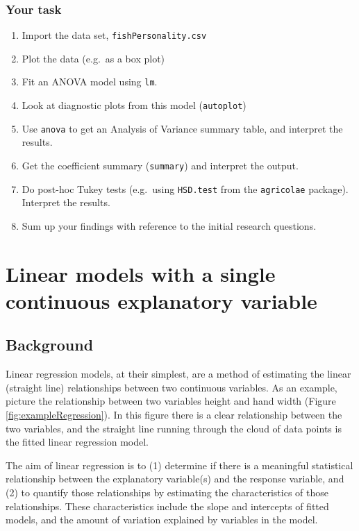 \documentclass[
  a4paperpaper,
]{book}
\begin{document}
\hypertarget{your-task}{%
\subsection{Your task}\label{your-task}}

\begin{enumerate}
\def\labelenumi{\arabic{enumi})}
\item
  Import the data set, \texttt{fishPersonality.csv}
\item
  Plot the data (e.g.~as a box plot)
\item
  Fit an ANOVA model using \texttt{lm}.
\item
  Look at diagnostic plots from this model (\texttt{autoplot})
\item
  Use \texttt{anova} to get an Analysis of Variance summary table, and interpret the results.
\item
  Get the coefficient summary (\texttt{summary}) and interpret the output.
\item
  Do post-hoc Tukey tests (e.g.~using \texttt{HSD.test} from the \texttt{agricolae} package). Interpret the results.
\item
  Sum up your findings with reference to the initial research questions.
\end{enumerate}

\hypertarget{linear-models-with-a-single-continuous-explanatory-variable}{%
\chapter{Linear models with a single continuous explanatory variable}\label{linear-models-with-a-single-continuous-explanatory-variable}}

\hypertarget{background}{%
\section{Background}\label{background}}

Linear regression models, at their simplest, are a method of estimating the linear (straight line) relationships between two continuous variables. As an example, picture the relationship between two variables height and hand width (Figure \ref{fig:exampleRegression}). In this figure there is a clear relationship between the two variables, and the straight line running through the cloud of data points is the fitted linear regression model.

The aim of linear regression is to (1) determine if there is a meaningful statistical relationship between the explanatory variable(s) and the response variable, and (2) to quantify those relationships by estimating the characteristics of those relationships. These characteristics include the slope and intercepts of fitted models, and the amount of variation explained by variables in the model.
\end{document}
